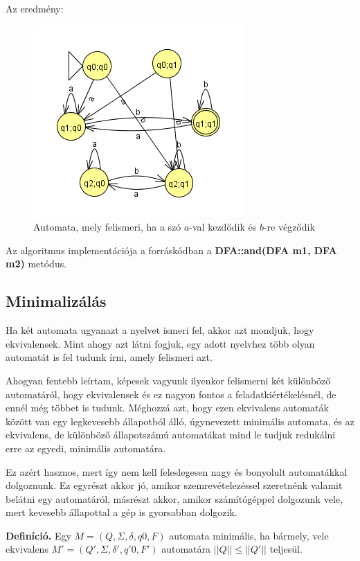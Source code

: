 \documentclass[12pt]{report}
\theoremstyle{definition}
\begin{document}
Az eredmény:

\begin{figure}[H]
\centering
\includegraphics[scale=1]{direkt_a-val_kezdodik_es_b_re_vegzodik.png}
\caption{\label{direkt4} Automata, mely felismeri, ha a szó $a$-val kezdődik és $b$-re végződik}
\end{figure}

Az algoritmus implementációja a forráskódban a \textbf{DFA::and(DFA m1, DFA m2)} metódus.

\subsection{Minimalizálás}
Ha két automata ugyanazt a nyelvet ismeri fel, akkor azt mondjuk, hogy ekvivalensek. Mint ahogy azt látni fogjuk, egy adott nyelvhez több olyan automatát is fel tudunk írni, amely felismeri azt.

Ahogyan fentebb leírtam, képesek vagyunk ilyenkor felismerni két különböző automatáról, hogy ekvivalensek és ez nagyon fontos a feladatkiértékelésnél, de ennél még többet is tudunk. Méghozzá azt, hogy ezen ekvivalens automaták között van egy legkevesebb állapotból álló, úgynevezett minimális automata, és az ekvivalens, de különböző állapotszámú automatákat mind le tudjuk redukálni erre az egyedi, minimális automatára.

Ez azért hasznos, mert így nem kell feleslegesen nagy és bonyolult automatákkal dolgoznunk. Ez egyrészt akkor jó, amikor szemrevételezéssel szeretnénk valamit belátni egy automatáról, másrészt akkor, amikor számítógéppel dolgozunk vele, mert kevesebb állapottal a gép is gyorsabban dolgozik.

\textbf{Definíció.} Egy $M = (Q, \Sigma, \delta, q0, F)$ automata minimális, ha bármely, vele ekvivalens $M' = (Q', \Sigma, \delta', q'0, F')$ automatára $||Q|| \leq ||Q'||$ teljesül.
\end{document}
